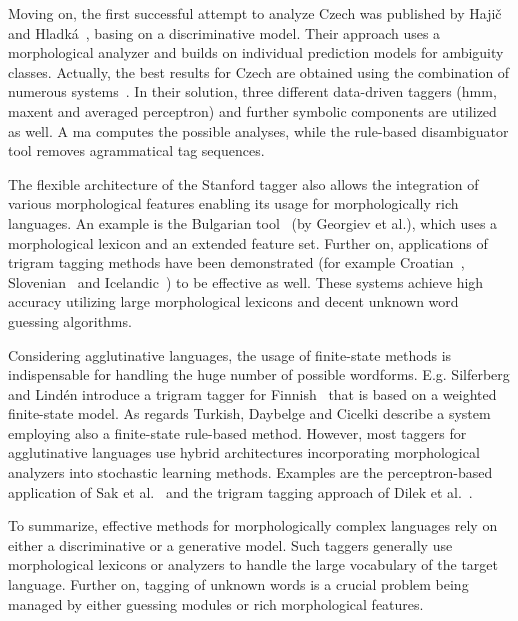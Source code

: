 Moving on, the first successful attempt to analyze Czech was published by Hajič and Hladká~\cite{Hajic1998a}, basing on a discriminative model.
Their approach uses a morphological analyzer and builds on individual prediction models for ambiguity classes.
Actually, the best results for Czech are obtained using the combination of numerous systems~\cite{Hajic2007}.
In their solution, three different data-driven taggers (\acrshort{hmm}, \acrlong{maxent} and averaged perceptron) and further symbolic components are utilized as well.
A \acrshort{ma} computes the possible analyses, while the rule-based disambiguator tool removes agrammatical tag sequences. 

The flexible architecture of the Stanford tagger \cite{Toutanova2003} also allows the integration of various morphological features enabling its usage for morphologically rich languages.
An example is the Bulgarian tool~\cite{Georgiev2012} (by Georgiev et al.), which uses a morphological lexicon and an extended feature set.
Further on, applications of trigram tagging methods \cite{Brants2000,Halacsy2007} have been demonstrated (for example Croatian~\cite{Agic2013}, Slovenian~\cite{Agic2013} and Icelandic~\cite{Loftsson2007}) to be effective as well.
These systems achieve high accuracy utilizing large morphological lexicons and decent unknown word guessing algorithms.

Considering agglutinative languages, the usage of finite-state methods is indispensable for handling the huge number of possible wordforms.
E.g. Silferberg and Lindén introduce a trigram tagger for Finnish~\cite{Silfverberg2011} that is based on a weighted finite-state model.
As regards Turkish, Daybelge and Cicelki describe a system~\cite{Daybelge2007} employing also a finite-state rule-based method.
However, most taggers for agglutinative languages use hybrid architectures incorporating morphological analyzers into stochastic learning methods.
Examples are the perceptron-based application of Sak et al.~\cite{Sak2007} and the trigram tagging approach of Dilek et al.~\cite{Hakkani-Tur2002}.

To summarize, effective methods for morphologically complex languages rely on either a discriminative or a generative model.
Such taggers generally use morphological lexicons or analyzers to handle the large vocabulary of the target language.
Further on, tagging of unknown words is a crucial problem being managed by either guessing modules or rich morphological features. 

